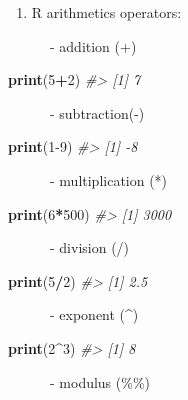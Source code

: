 \documentclass[
]{book}
\newenvironment{Shaded}{\begin{snugshade}}{\end{snugshade}}
\newcommand{\CommentTok}[1]{\textcolor[rgb]{0.56,0.35,0.01}{\textit{#1}}}
\newcommand{\DecValTok}[1]{\textcolor[rgb]{0.00,0.00,0.81}{#1}}
\newcommand{\FunctionTok}[1]{\textcolor[rgb]{0.13,0.29,0.53}{\textbf{#1}}}
\newcommand{\NormalTok}[1]{#1}
\newcommand{\SpecialCharTok}[1]{\textcolor[rgb]{0.81,0.36,0.00}{\textbf{#1}}}
\providecommand{\tightlist}{%
  \setlength{\itemsep}{0pt}\setlength{\parskip}{0pt}}
\begin{document}
\begin{enumerate}
\def\labelenumi{\arabic{enumi}.}
\tightlist
\item
  R arithmetics operators:
\end{enumerate}

~~~~~~- addition (+)

\begin{Shaded}
\begin{Highlighting}[]
\FunctionTok{print}\NormalTok{(}\DecValTok{5}\SpecialCharTok{+}\DecValTok{2}\NormalTok{)}
\CommentTok{\#\textgreater{} [1] 7}
\end{Highlighting}
\end{Shaded}

~~~~~~- subtraction(-)

\begin{Shaded}
\begin{Highlighting}[]
\FunctionTok{print}\NormalTok{(}\DecValTok{1{-}9}\NormalTok{)}
\CommentTok{\#\textgreater{} [1] {-}8}
\end{Highlighting}
\end{Shaded}

~~~~~~- multiplication (*)

\begin{Shaded}
\begin{Highlighting}[]
\FunctionTok{print}\NormalTok{(}\DecValTok{6}\SpecialCharTok{*}\DecValTok{500}\NormalTok{)}
\CommentTok{\#\textgreater{} [1] 3000}
\end{Highlighting}
\end{Shaded}

~~~~~~- division (/)

\begin{Shaded}
\begin{Highlighting}[]
\FunctionTok{print}\NormalTok{(}\DecValTok{5}\SpecialCharTok{/}\DecValTok{2}\NormalTok{)}
\CommentTok{\#\textgreater{} [1] 2.5}
\end{Highlighting}
\end{Shaded}

~~~~~~- exponent (\^{})

\begin{Shaded}
\begin{Highlighting}[]
\FunctionTok{print}\NormalTok{(}\DecValTok{2}\SpecialCharTok{\^{}}\DecValTok{3}\NormalTok{)}
\CommentTok{\#\textgreater{} [1] 8}
\end{Highlighting}
\end{Shaded}

~~~~~~- modulus (\%\%)
\end{document}
